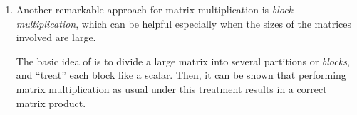 \begin{enumerate}
Examples:
\begin{itemize}
\item \begin{align*}
\mqty[1&2&3\\ 3&2&1]\mqty[1&0\\ 0&1\\ 1&2]
&=\mqty[
\mqty[\blc{1}&\vc{2}&\orc{3}]
\mqty[\blc{1}&\blc{0}\\ \vc{0}&\vc{1}\\ \orc{1}&\orc{2}]\\
\mqty[\blc{3}&\vc{2}&\orc{1}]
\mqty[\blc{1}&\blc{0}\\ \vc{0}&\vc{1}\\ \orc{1}&\orc{2}]
]\\
&=\mqty[
\blc{1}\mqty[\blc{1}&\blc{0}]
+\vc{2}\mqty[\vc{0}&\vc{1}]
+\orc{3}\mqty[\orc{1}&\orc{2}]
\\
\blc{3}\mqty[\blc{1}&\blc{0}]
+\vc{2}\mqty[\vc{0}&\vc{1}]
+\orc{1}\mqty[\orc{1}&\orc{2}]
]\\
&=\mqty[4&8\\ 4&4]
\end{align*}

\item \begin{align*}
\mqty[1&2&3\\ \rc{3}&\rc{2}&\rc{1}]\mqty[\rc{1}&0\\ \rc{0}&1\\ \rc{1}&2]
&=\mqty[
\mqty[1&2&3]
\mqty[1&0\\ 0&1\\ 1&2]\\
\mqty[\rc{3}&\rc{2}&\rc{1}]
\mqty[\rc{1}&0\\ \rc{0}&1\\ \rc{1}&2]
]\\
&=\mqty[
1\mqty[1&0]
+2\mqty[0&1]
+3\mqty[1&2]
\\
\rc{3}\mqty[\rc{1}&0]
+\rc{2}\mqty[\rc{0}&1]
+\rc{1}\mqty[\rc{1}&2]
]\\
&=\mqty[4&8\\ \rc{4}&4]
\end{align*}
\end{itemize}
\item Another remarkable approach for matrix multiplication is \emph{block
multiplication}, which can be helpful especially when the sizes of the matrices
involved are large.

The basic idea of  is to divide a large matrix into
several partitions or \emph{blocks}, and ``treat'' each block like a scalar.
Then, it can be shown that performing matrix multiplication as usual under this
treatment results in a correct matrix product.


\end{enumerate}
